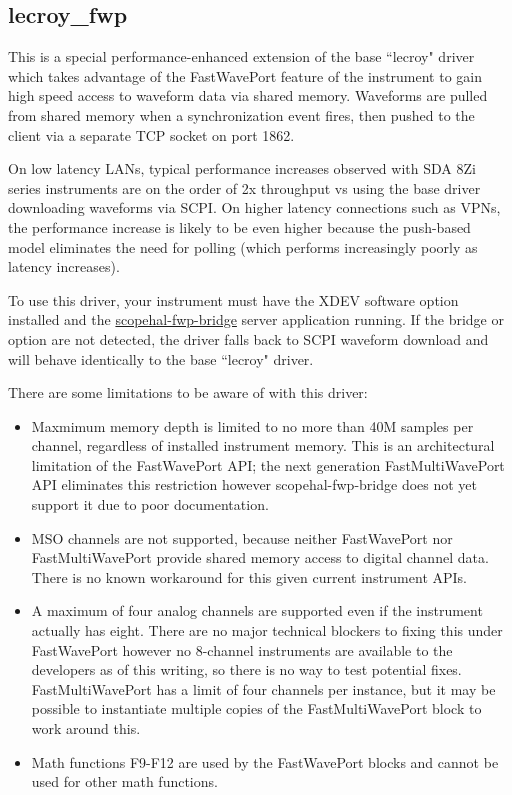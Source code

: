 \subsection{lecroy\_fwp}

This is a special performance-enhanced extension of the base ``lecroy" driver which takes advantage of the FastWavePort
feature of the instrument to gain high speed access to waveform data via shared memory. Waveforms are pulled from
shared memory when a synchronization event fires, then pushed to the client via a separate TCP socket on port 1862.

On low latency LANs, typical performance increases observed with SDA 8Zi series instruments are on the order of 2x
throughput vs using the base driver downloading waveforms via SCPI. On higher latency connections such as VPNs, the
performance increase is likely to be even higher because the push-based model eliminates the need for polling (which
performs increasingly poorly as latency increases).

To use this driver, your instrument must have the XDEV software option installed and the
\href{https://github.com/ngscopeclient/scopehal-fwp-bridge}{scopehal-fwp-bridge} server application running. If the
bridge or option are not detected, the driver falls back to SCPI waveform download and will behave identically to the
base ``lecroy" driver.

There are some limitations to be aware of with this driver:
\begin{itemize}

\item Maxmimum memory depth is limited to no more than 40M samples per channel, regardless of installed instrument
memory. This is an architectural limitation of the FastWavePort API; the next generation FastMultiWavePort API eliminates
this restriction however scopehal-fwp-bridge does not yet support it due to poor documentation.

\item MSO channels are not supported, because neither FastWavePort nor FastMultiWavePort provide shared memory access to
digital channel data. There is no known workaround for this given current instrument APIs.

\item A maximum of four analog channels are supported even if the instrument actually has eight. There are no major
technical blockers to fixing this under FastWavePort however no 8-channel instruments are available to the developers as
of this writing, so there is no way to test potential fixes. FastMultiWavePort has a limit of four channels per instance,
but it may be possible to instantiate multiple copies of the FastMultiWavePort block to work around this.

\item Math functions F9-F12 are used by the FastWavePort blocks and cannot be used for other math functions.

\end{itemize}


